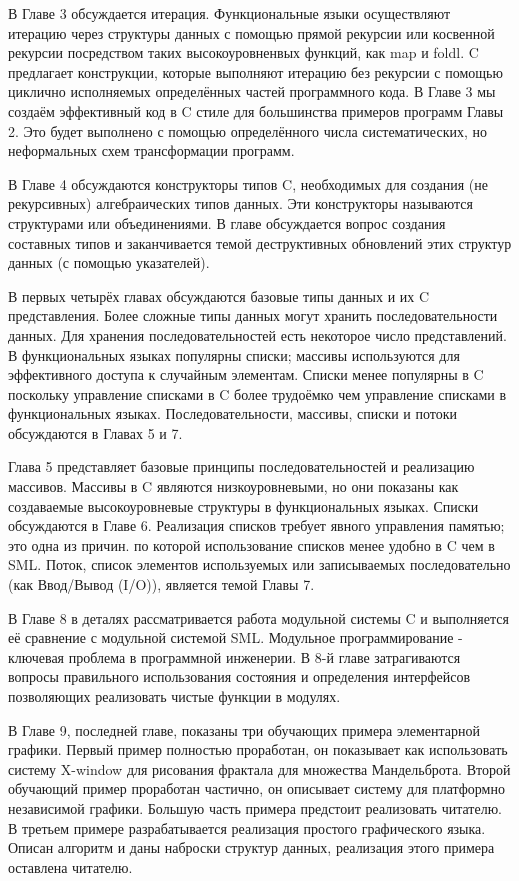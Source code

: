 В Главе 3 обсуждается итерация. Функциональные языки осуществляют итерацию через структуры данных с помощью прямой рекурсии или косвенной рекурсии посредством таких высокоуровненвых функций, как map и foldl. C предлагает конструкции, которые выполняют итерацию без рекурсии с помощью циклично исполняемых определённых частей программного кода. В Главе 3 мы создаём эффективный код в C стиле для большинства примеров программ Главы 2. Это будет выполнено с помощью определённого числа систематических, но неформальных схем трансформации программ.

В Главе 4 обсуждаются конструкторы типов C, необходимых для создания (не рекурсивных) алгебраических типов данных. Эти конструкторы называются структурами или объединениями. В главе обсуждается вопрос создания составных типов и заканчивается темой деструктивных обновлений этих структур данных (с помощью указателей).

В первых четырёх главах обсуждаются базовые типы данных и их C представления. Более сложные типы данных могут хранить последовательности данных. Для хранения последовательностей есть некоторое число представлений. В функциональных языках популярны списки; массивы используются для эффективного доступа к случайным элементам. Списки менее популярны в C поскольку управление списками в C более трудоёмко чем управление списками в функциональных языках. Последовательности, массивы, списки и потоки обсуждаются в Главах 5 и 7.

Глава 5 представляет базовые принципы последовательностей и реализацию массивов. Массивы в C являются низкоуровневыми, но они показаны как создаваемые высокоуровневые структуры в функциональных языках. Списки обсуждаются в Главе 6. Реализация списков требует явного управления памятью; это одна из причин. по которой использование списков менее удобно в C чем в SML. Поток, список элементов используемых или записываемых последовательно (как Ввод/Вывод (I/O)), является темой Главы 7.

В Главе 8 в деталях рассматривается работа модульной системы C и выполняется её сравнение с модульной системой SML. Модульное программирование - ключевая проблема в программной инженерии. В 8-й главе затрагиваются вопросы правильного использования состояния и определения интерфейсов позволяющих реализовать чистые функции в модулях.

В Главе 9, последней главе, показаны три обучающих примера элементарной графики. Первый пример полностью проработан, он показывает как использовать систему X-window для рисования фрактала для множества Мандельброта. Второй обучающий пример проработан частично, он описывает систему для платформно независимой графики. Большую часть примера предстоит реализовать читателю. В третьем примере разрабатывается реализация простого графического языка. Описан алгоритм и даны наброски структур данных, реализация этого примера оставлена читателю.

